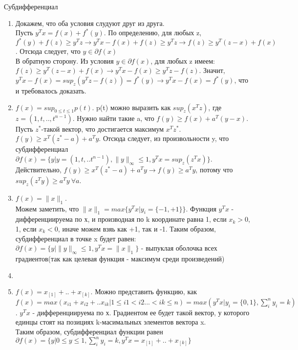 \documentclass[12pt]{extreport}
\theoremstyle{definiton}
\theoremstyle{definition}
\theoremstyle{definition}
\let\leq\leqslant
\let\geq\geqslant
\def\prend{
	\medskip
}
\begin{document}
    \PR[] Субдифференциал
    \begin{enumerate}
    \item Докажем, что оба условия слудуют друг из друга.
    \\ Пусть $y^Tx=f(x)+f^*(y)$. По определению, для любых z, $f^*(y)+f(z)\geq y^Tz\to y^Tx-f(x)+f(z)\geq y^Tz\to f(z)\geq y^T(z-x)+f(x)$. Отсюда следует, что $y \in \partial f(x)$
    \\ В обратную сторону. Из условия $y \in \partial f(x)$, для любых z имеем:
    \\ $f(z)\geq y^T(z-x)+f(x)\to y^Tx - f(x) \geq y^Tz-f(z)$. Значит, $y^Tx - f(x) = sup_z(y^Tz-f(z))=f^*(y)\to y^Tx-f(x)=f^*(y)$, что и требовалось доказать.
    \item $f(x) = sup_{0\leq t \leq 1}p(t)$. p(t) можно выразить как $sup_z(x^Tz)$, где $z=(1,t,..,t^{n-1})$. Нужно найти такие a, что $f(y)\geq f(x) + a^T(y-x)$. Пусть $z^*$-такой вектор, что достигается максимум $x^Tz^*$.
    \\$f(y) \geq x^T(z^*-a)+a^Ty$. Отсюда следует, из произвольности y, что субдифференциал $\partial f(x) = \{y|y=(1,t,..t^{n-1}),\|y\|_{\infty} \leq 1, y^Tx=sup_z(z^Tx)\}$.
    \\ Действительно, $f(y) \geq x^T(z^*-a)+a^Ty\to f(y) \geq a^Ty$, потому что $sup_z(z^Ty) \geq a^Ty\ \forall a$. 
    \item $f(x)=\|x\|_1$.
    \\Можем заметить, что $\|x\|_1=max\{y^Tx|y_i=\{-1,+1\}\}$. Функция $y^Tx$ - дифференциируема по х, и производная по k координате равна 1, если $x_k>0$, 1, если $x_k<0$, иначе можем взяь как +1, так и -1. Таким образом, субдифференциал в точке x будет равен:
    \\$\partial f(x) = \{y|\|y\|_{\infty}\leq 1, y^Tx=\|x\|_1\}$ - выпуклая оболочка всех градиентов(так как целевая функция - максимум среди произведений)
    \item
    \item $f(x) = x_{[1]}+..+x_{[k]}$. Можно представить функцию, как $f(x)=max(x_{i1}+x_{i2}+..x_{ik}|1 \leq i1 < i2 ... < ik \leq n)=max(y^Tx|y_i=\{0,1\}, \sum_i^n y_i = k)$. $y^Tx$ - дифференциируема по х. Градиентом ее будет такой вектор, у которого единцы стоят на позициях k-масимальных элементов вектора x.
    \\ Таким образом, субдифференциал функции равен $\partial f(x) = \{y|0 \leq y \leq 1, \sum_i^ny_i=k, y^Tx=x_{[1]}+..+x_{[k]}\}$
    \end{enumerate}
    \prend
\end{document}
